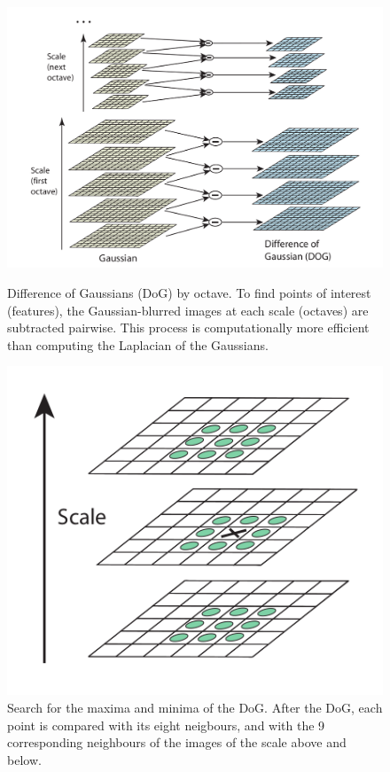 \begin{figure}[ht]
	\begin{minipage}[b]{0.65\linewidth}
		\centering
		\includegraphics[width=\textwidth]{images/sift1.png}
		\caption[Difference of Gaussians (DoG) by octave]{Difference of Gaussians (DoG) by octave. To find points of interest (features), the Gaussian-blurred images at each scale (octaves) are subtracted pairwise. This process is computationally more efficient than computing the Laplacian of the Gaussians. \cite{sift}}
		\label{sec2:fig:DoG}
	\end{minipage}
	\hspace{0.5cm}
	\begin{minipage}[b]{0.3\linewidth}
		\centering
		\includegraphics[width=\textwidth]{images/sift2.png}
		\caption[Search for the maxima and minima of the DoG]{Search for the maxima and minima of the DoG. After the DoG, each point is compared with its eight neigbours, and with the 9 corresponding neighbours of the images of the scale above and below. \cite{sift}}
		\label{sec2:fig:maxima}
	\end{minipage}
\end{figure}

